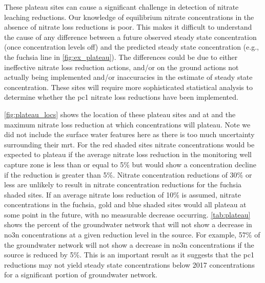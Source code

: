 

These plateau sites can cause a significant challenge in detection of nitrate leaching reductions.
Our knowledge of equilibrium nitrate concentrations in the absence of nitrate loss reductions is poor.
This makes it difficult to understand the cause of any difference between a future observed steady state concentration (once concentration levels off) and the predicted steady state concentration (e.g., the fuchsia line in \autoref{fig:ex_plateau}).
The differences could be due to either ineffective nitrate loss reduction actions, and/or on the ground actions not actually being implemented and/or inaccuracies in the estimate of steady state concentration.
These sites will require more sophisticated statistical analysis to determine whether the \gls{pc1} nitrate loss reductions have been implemented.

\autoref{fig:plateau_locs} shows the location of these plateau sites and at and the maximum nitrate loss reduction at which concentrations will plateau.
Note we did not include the surface water features here as there is too much uncertainty surrounding their \gls{mrt}.
For the red shaded sites nitrate concentrations would be expected to plateau if the average nitrate loss reduction in the monitoring well capture zone is less than or equal to 5\% but would show a concentration decline if the reduction is greater than 5\%.
Nitrate concentration reductions of 30\% or less are unlikely to result in nitrate concentration reductions for the fuchsia shaded sites.
If an average nitrate loss reduction of 10\% is assumed, nitrate concentrations in the fuchsia, gold and blue shaded sites would all plateau at some point in the future, with no measurable decrease occurring.
\autoref{tab:plateau} shows the percent of the groundwater network that will not show a decrease in \gls{no3n} concentrations at a given reduction level in the source.
For example, 57\% of the groundwater network will not show a decrease in \gls{no3n} concentrations if the source is reduced by 5\%.
This is an important result as it suggests that the \gls{pc1} reductions may not yield steady state concentrations below 2017 concentrations for a significant portion of groundwater network.

\begin{landscape}
\end{landscape}

